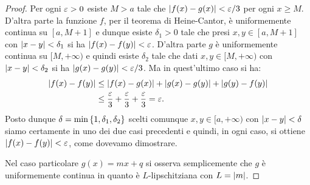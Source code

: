 \begin{proof}
Per ogni $\varepsilon>0$ esiste $M>a$ tale che ${\left|f(x)-g(x)\right|} < \varepsilon/3$ per ogni $x\ge M$. D'altra parte la funzione $f$, per il teorema di Heine-Cantor, è uniformemente continua su $[a,M+1]$ e dunque esiste $\delta_1>0$ tale che presi $x,y \in [a,M+1]$ con ${\left|x-y\right|}< \delta_1$
si ha ${\left|f(x)-f(y)\right|} < \varepsilon$. D'altra parte $g$ è uniformemente continua su $[M,+\infty)$ e quindi esiste $\delta_2$ tale che dati $x,y\in [M,+\infty)$ con ${\left|x-y\right|} < \delta_2$ si ha ${\left|g(x)-g(y)\right|} < \varepsilon/3$. Ma in quest'ultimo caso si ha:
\begin{align*}
  {\left|f(x)-f(y)\right|} &\le {\left|f(x) - g(x)\right|} + {\left|g(x) - g(y)\right|} + {\left|g(y)-f(y)\right|} \\
  & \le \frac{\varepsilon}{3} + \frac{\varepsilon}{3} + \frac{\varepsilon}{3} = \varepsilon.
\end{align*}
Posto dunque $\delta = \min{\left\{ 1, \delta_1, \delta_2 \right\}}$
scelti comunque $x,y\in [a,+\infty)$ con ${\left|x-y\right|}< \delta$ siamo certamente in uno dei due casi precedenti e quindi, in ogni caso, si ottiene ${\left|f(x)-f(y)\right|} < \varepsilon$, come dovevamo dimostrare.

Nel caso particolare $g(x) = mx +q$ si osserva semplicemente che $g$ è uniformemente continua in quanto è $L$-lipschitziana con $L={\left|m\right|}$.
\end{proof}


